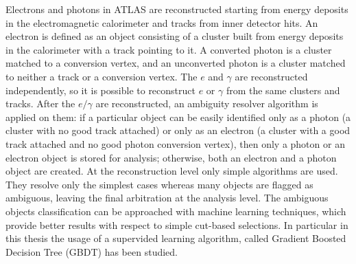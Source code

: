 \documentclass[a4paper, oneside, 11pt]{book}
\begin{document}
	
	
	
	
	
	
	\iffalse
	Electrons and photons in ATLAS are reconstructed starting from energy deposits in the electromagnetic calorimeter and tracks from inner detector hits. An electron is defined as an object consisting of a cluster built from energy deposits in the calorimeter with a track pointing to it. A converted photon is a cluster matched to a conversion vertex, and an unconverted photon is a cluster matched to neither a track or a conversion vertex. The $e$ and $\gamma$ are reconstructed independently, so it is possible to reconstruct $e$ or $\gamma$ from the same clusters and tracks. After the $e/\gamma$ are reconstructed, an ambiguity resolver algorithm is applied on them: if a particular object can be easily identified only as a photon (a cluster with no good track attached) or only as an electron (a cluster with a good track attached and no good photon conversion vertex), then only a photon or an electron object is stored for analysis; otherwise, both an electron and a photon object are created. At the reconstruction level only simple algorithms are used. They resolve only the simplest cases whereas many objects are flagged as ambiguous, leaving the final arbitration at the analysis level. The ambiguous objects classification can be approached with machine learning techniques, which provide better results with respect to simple cut-based selections. In particular in this thesis the usage of a supervided learning algorithm, called Gradient Boosted  Decision Tree (GBDT) has been studied.
	
\end{document}
